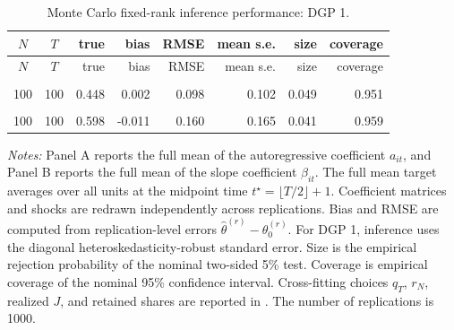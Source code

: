 \begingroup
\small
\setlength{\LTleft}{0pt plus 1fill}
\setlength{\LTright}{0pt plus 1fill}
\begin{longtable}{ccrrrrrr}
\caption{Monte Carlo fixed-rank inference performance: DGP 1.}\label{tab:mc_perf_dgp1}\label{tab:mc_main_summary}\\
\toprule
$N$ & $T$ & true & bias & RMSE & mean s.e. & size & coverage \\
\midrule
\endfirsthead
\toprule
$N$ & $T$ & true & bias & RMSE & mean s.e. & size & coverage \\
\midrule
\endhead
\bottomrule
\endfoot
\multicolumn{8}{l}{\textit{Panel A. Autoregressive coefficient full mean}}\\
100 & 100 & 0.448 & 0.002 & 0.098 & 0.102 & 0.049 & 0.951 \\
\addlinespace
\multicolumn{8}{l}{\textit{Panel B. Slope coefficient full mean}}\\
100 & 100 & 0.598 & -0.011 & 0.160 & 0.165 & 0.041 & 0.959 \\
\end{longtable}
\par\smallskip
{\footnotesize\begin{minipage}{0.92\textwidth}\textit{Notes:} Panel A reports the full mean of the autoregressive coefficient $a_{it}$, and Panel B reports the full mean of the slope coefficient $\beta_{it}$. The full mean target averages over all units at the midpoint time $t^\star=\lfloor T/2\rfloor+1$. Coefficient matrices and shocks are redrawn independently across replications. Bias and RMSE are computed from replication-level errors $\widehat\theta^{(r)}-\theta_0^{(r)}$. For DGP 1, inference uses the diagonal heteroskedasticity-robust standard error. Size is the empirical rejection probability of the nominal two-sided 5\% test. Coverage is empirical coverage of the nominal 95\% confidence interval. Cross-fitting choices $q_T$, $r_N$, realized $J$, and retained shares are reported in . The number of replications is 1000.\end{minipage}}
\endgroup
